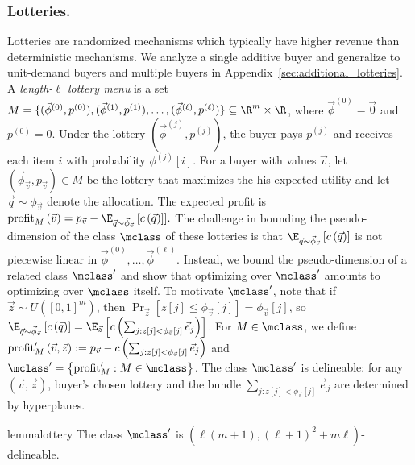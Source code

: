 \subsubsection{Lotteries.}
Lotteries are randomized mechanisms which typically have higher  revenue than deterministic mechanisms.  We analyze a single additive buyer and generalize to unit-demand buyers and multiple buyers in Appendix~\ref{sec:additional_lotteries}.
A \emph{length-$\ell$ lottery menu} is a set $M = \{(\vec{\phi}^{(0)}, p^{(0)}), (\vec{\phi}^{(1)}, p^{(1)}), \dots, (\vec{\phi}^{(\ell)}, p^{(\ell)})\} \subseteq \R^m \times \R$, where $\vec{\phi}^{\left(0\right)} = \vec{0}$ and $p^{\left(0\right)}= 0$. Under the lottery $\left(\vec{\phi}^{(j)}, p^{(j)}\right)$, the buyer pays $p^{(j)}$ and receives each item $i$ with probability $\phi^{(j)}[i]$. For a buyer with values $\vec{v}$, let $\left(\vec{\phi}_{\vec{v}}, p_{\vec{v}}\right) \in M$ be the lottery that maximizes the his expected utility and let $\vec{q} \sim \phi_{\vec{v}}$ denote the allocation. The expected profit is $\profit_{M} \left(\vec{v}\right) = p_{\vec{v}} - \E_{\vec{q} \sim \vec{\phi}_{\vec{v}}}\left[c\left(\vec{q}\right)\right]].$
The challenge in bounding the pseudo-dimension of the class $\mclass$ of these lotteries is that $\E_{\vec{q} \sim \vec{\phi}_{\vec{v}}}\left[c\left(\vec{q}\right)\right]$ is not piecewise linear in $\vec{\phi}^{\left(0\right)}, \dots, \vec{\phi}^{\left(\ell\right)}$. Instead, we bound the pseudo-dimension of a related class $\mclass'$ and show that optimizing over $\mclass'$ amounts to optimizing over $\mclass$ itself. To motivate $\mclass'$, note that if $\vec{z} \sim U\left([0,1]^m\right)$, then $\Pr_{\vec{z}}[z[j] \leq \phi_{\vec{v}}[j]] = \phi_{\vec{v}}[j]$, so $\E_{\vec{q} \sim \vec{\phi}_{\vec{v}}}\left[c\left(\vec{q}\right)\right] = \E_{\vec{z}}\left[c\left(\sum_{j: z[j] < \phi_{\vec{v}}[j]} \vec{e}_j\right)\right]$. For $M \in \mclass$, we define $\textnormal{profit}_{M} '\left(\vec{v}, \vec{z}\right) := p_{\vec{v}} - c\left(\sum_{j: z[j] < \phi_{\vec{v}}[j]} \vec{e}_j\right)$ and $\mclass' = \left\{\profit_M' : M \in \mclass\right\}$. The class $\mclass'$ is delineable: for any $\left(\vec{v}, \vec{z}\right)$, buyer's chosen lottery and the bundle $\sum_{j: z[j] < \phi_{\vec{v}}[j]} \vec{e}_j$ are determined by hyperplanes.

\begin{restatable}{lemma}{lottery}\label{lem:lottery}
The class $\mclass'$ is $\left(\ell\left(m+1\right), \left(\ell+1\right)^2 + m\ell\right)$-delineable.
\end{restatable}


